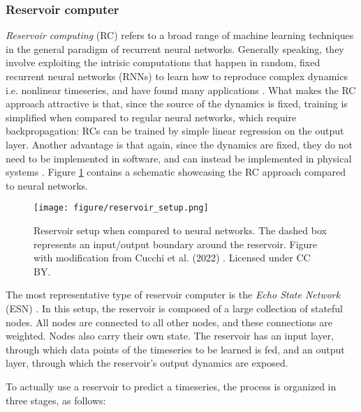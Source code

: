 \subsubsection{Reservoir computer}
\label{sec:reservoir}
\textit{Reservoir computing} (RC) refers to a broad range of machine learning techniques \cite{reservoiroverview} in the general paradigm of recurrent neural networks. Generally speaking, they involve exploiting the intrisic computations that happen in random, fixed recurrent neural networks (RNNs) to learn how to reproduce complex dynamics i.e. nonlinear timeseries, and have found many applications \cite{windspeedreservoir}\cite{jaeger2002adaptive}. What makes the RC approach attractive is that, since the source of the dynamics is fixed, training is simplified when compared to regular neural networks, which require backpropagation: RCs can be trained by simple linear regression on the output layer. Another advantage is that again, since the dynamics are fixed, they do not need to be implemented in software, and can instead be implemented in physical systems \cite{Cucchi_2022}. Figure \ref{fig:reservoirsetup} contains a schematic showcasing the RC approach compared to neural networks.

\begin{figure}
    \centering
    \texttt{[image: figure/reservoir\_setup.png]}
    \caption{Reservoir setup when compared to neural networks. The dashed box represents an input/output boundary around the reservoir. Figure with modification from Cucchi et al. (2022) \cite{Cucchi_2022}. Licensed under CC BY.}
    \label{fig:reservoirsetup}
\end{figure}

The most representative type of reservoir computer is the \textit{Echo State Network} (ESN) \cite{jaeger2001echo}. In this setup, the reservoir is composed of a large collection of stateful nodes. All nodes are connected to all other nodes, and these connections are weighted. Nodes also carry their own state. The reservoir has an input layer, through which data points of the timeseries to be learned is fed, and an output layer, through which the reservoir's output dynamics are exposed.

To actually use a reservoir to predict a timeseries, the process is organized in three stages, as follows: 

